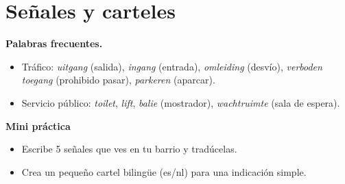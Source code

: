 \section{Señales y carteles}
\textbf{Palabras frecuentes.}
\begin{itemize}[leftmargin=*]
  \item Tráfico: \textit{uitgang} (salida), \textit{ingang} (entrada), \textit{omleiding} (desvío), \textit{verboden toegang} (prohibido pasar), \textit{parkeren} (aparcar).
  \item Servicio público: \textit{toilet}, \textit{lift}, \textit{balie} (mostrador), \textit{wachtruimte} (sala de espera).
\end{itemize}

\textbf{Mini práctica}
\begin{itemize}[leftmargin=*]
  \item Escribe 5 señales que ves en tu barrio y tradúcelas.
  \item Crea un pequeño cartel bilingüe (es/nl) para una indicación simple.
\end{itemize}
